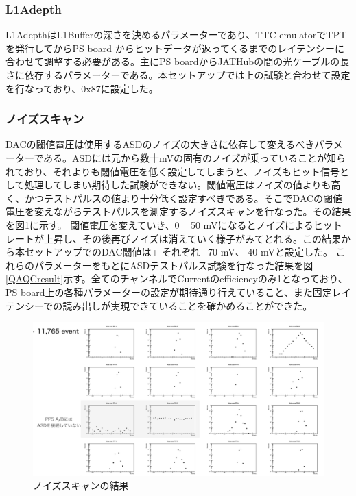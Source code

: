 \subsubsection{L1Adepth}
L1AdepthはL1Bufferの深さを決めるパラメーターであり、TTC emulatorでTPTを発行してからPS board からヒットデータが返ってくるまでのレイテンシーに合わせて調整する必要がある。主にPS boardからJATHubの間の光ケーブルの長さに依存するパラメーターである。本セットアップでは上の試験と合わせて設定を行なっており、0x87に設定した。
\baselineskip

\subsubsection{ノイズスキャン}
DACの閾値電圧は使用するASDのノイズの大きさに依存して変えるべきパラメーターである。ASDには元から数十mVの固有のノイズが乗っていることが知られており、それよりも閾値電圧を低く設定してしまうと、ノイズもヒット信号として処理してしまい期待した試験ができない。閾値電圧はノイズの値よりも高く、かつテストパルスの値より十分低く設定すべきである。そこでDACの閾値電圧を変えながらテストパルスを測定するノイズスキャンを行なった。その結果を図\ref{QAQCnoisescan}に示す。
閾値電圧を変えていき、0 ~ 50 mVになるとノイズによるヒットレートが上昇し、その後再びノイズは消えていく様子がみてとれる。この結果から本セットアップでのDAC閾値は+-それぞれ+70 mV、-40 mVと設定した。
これらのパラメーターをもとにASDテストパルス試験を行なった結果を図\ref{QAQCresult}示す。全てのチャンネルでCurrentのefficiencyのみ1となっており、PS board上の各種パラメーターの設定が期待通り行えていること、また固定レイテンシーでの読み出しが実現できていることを確かめることができた。
\baselineskip

\begin{figure} 
\centering
\includegraphics[width=16cm]{fig/QAQC/QAQCnoisescan.png}
\caption[ノイズスキャン]{ノイズスキャンの結果}
\label{QAQCnoisescan}
\end{figure}

